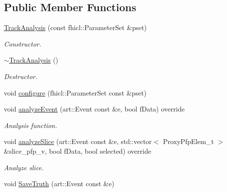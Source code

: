 \subsection*{Public Member Functions}
\begin{DoxyCompactItemize}
\item 
\hyperlink{classanalysis_1_1TrackAnalysis_aed13157ba9297149fe4e15676e6db7fc}{Track\-Analysis} (const fhicl\-::\-Parameter\-Set \&pset)
\begin{DoxyCompactList}\small\item\em Constructor. \end{DoxyCompactList}\item 
\hypertarget{classanalysis_1_1TrackAnalysis_a6f96bc87ab6d9dffb6417d7d2f1a89e2}{\hyperlink{classanalysis_1_1TrackAnalysis_a6f96bc87ab6d9dffb6417d7d2f1a89e2}{$\sim$\-Track\-Analysis} ()}\label{classanalysis_1_1TrackAnalysis_a6f96bc87ab6d9dffb6417d7d2f1a89e2}

\begin{DoxyCompactList}\small\item\em Destructor. \end{DoxyCompactList}\item 
void \hyperlink{classanalysis_1_1TrackAnalysis_a427d588370a8044b77560c92d3a35ea6}{configure} (fhicl\-::\-Parameter\-Set const \&pset)
\item 
void \hyperlink{classanalysis_1_1TrackAnalysis_aa5a295fc3fe8aa050905361f469ff108}{analyze\-Event} (art\-::\-Event const \&e, bool f\-Data) override
\begin{DoxyCompactList}\small\item\em Analysis function. \end{DoxyCompactList}\item 
\hypertarget{classanalysis_1_1TrackAnalysis_a00e51059eed5a6486c9eb2f2f16017de}{void \hyperlink{classanalysis_1_1TrackAnalysis_a00e51059eed5a6486c9eb2f2f16017de}{analyze\-Slice} (art\-::\-Event const \&e, std\-::vector$<$ Proxy\-Pfp\-Elem\-\_\-t $>$ \&slice\-\_\-pfp\-\_\-v, bool f\-Data, bool selected) override}\label{classanalysis_1_1TrackAnalysis_a00e51059eed5a6486c9eb2f2f16017de}

\begin{DoxyCompactList}\small\item\em Analyze slice. \end{DoxyCompactList}\item 
\hypertarget{classanalysis_1_1TrackAnalysis_adde7746b5a45ec99cd67c0ab1fa19eb1}{void \hyperlink{classanalysis_1_1TrackAnalysis_adde7746b5a45ec99cd67c0ab1fa19eb1}{Save\-Truth} (art\-::\-Event const \&e)}\label{classanalysis_1_1TrackAnalysis_adde7746b5a45ec99cd67c0ab1fa19eb1}


\end{DoxyCompactItemize}
